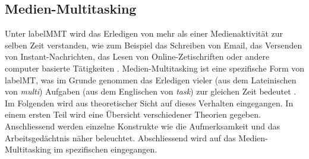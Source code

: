 \subsection{Medien-Multitasking}\label{subsection.medienMultitasking}
Unter \gls{labelMMT} wird das Erledigen von mehr als einer Medienaktivität zur selben Zeit verstanden, wie zum Beispiel das Schreiben von Email, das Versenden von Instant-Nachrichten, das Lesen von Online-Zetischriften oder andere computer basierte Tätigkeiten \cite{Foehr2006}. Medien-Multitasking ist eine spezifische Form von \gls{labelMT}, was im Grunde genommen das Erledigen vieler (aus dem Lateinischen von \textit{multi}) Aufgaben (aus dem Englischen von \textit{task}) zur gleichen Zeit bedeutet \cite{Spitzer2012}.  Im Folgenden wird aus theoretischer Sicht auf dieses Verhalten eingegangen. In einem ersten Teil wird eine Übersicht verschiedener Theorien gegeben. Anschliessend werden einzelne Konstrukte wie die Aufmerksamkeit und das Arbeitsgedächtnis näher beleuchtet. Abschliessend wird auf das Medien-Multitasking im spezifischen eingegangen.\\
